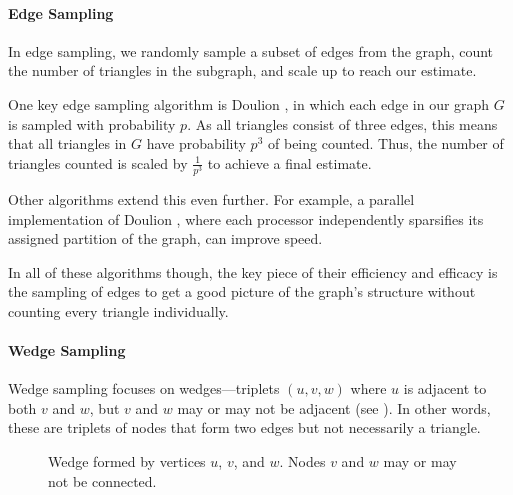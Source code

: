 \documentclass[11pt, margin=1in]{article}
\begin{document}
\paragraph{Edge Sampling}

In edge sampling, we randomly sample a subset of edges from the graph, count the number of triangles in the subgraph, and scale up to reach our estimate.

One key edge sampling algorithm is Doulion \cite{tsourakakis_doulion_2009}, in which each edge in our graph $G$ is sampled with probability $p$.
As all triangles consist of three edges, this means that all triangles in $G$ have probability $p^3$ of being counted.
Thus, the number of triangles counted is scaled by $\frac{1}{p^3}$ to achieve a final estimate.

Other algorithms extend this even further.
For example, a parallel implementation of Doulion \cite{arifuzzaman_parallel_2012}, where each processor independently sparsifies its assigned partition of the graph, can improve speed.

In all of these algorithms though, the key piece of their efficiency and efficacy is the sampling of edges to get a good picture of the graph's structure without counting every triangle individually.

\paragraph{Wedge Sampling}

Wedge sampling \cite{seshadhri_triadic_2013} focuses on wedges—triplets $(u, v, w)$ where $u$ is adjacent to both $v$ and $w$, but $v$ and $w$ may or may not be adjacent (see ).
In other words, these are triplets of nodes that form two edges but not necessarily a triangle.

\begin{figure}[H]
    \centering
    \caption{Wedge formed by vertices $u$, $v$, and $w$. Nodes $v$ and $w$ may or may not be connected.}
    \label{fig:wedge_diagram}
\end{figure}
\end{document}
